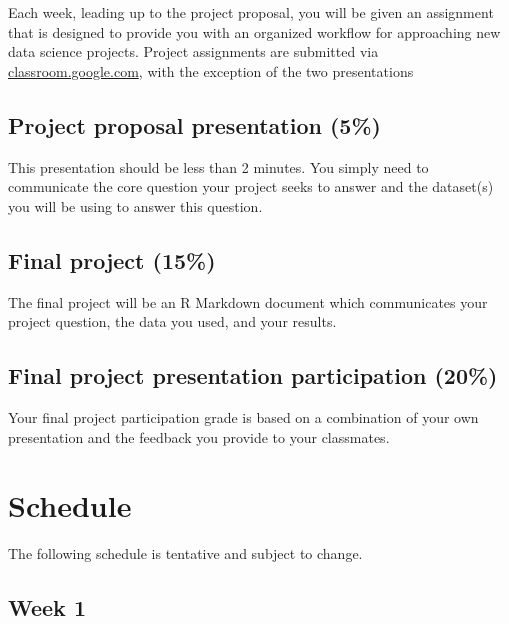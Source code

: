 \documentclass[]{book}
\theoremstyle{definition}
\theoremstyle{definition}
\theoremstyle{remark}
\begin{document}
Each week, leading up to the project proposal, you will be given an
assignment that is designed to provide you with an organized workflow
for approaching new data science projects. Project assignments are
submitted via \href{https//classroom.google.com}{classroom.google.com},
with the exception of the two presentations

\subsection*{Project proposal presentation
(5\%)}\label{project-proposal-presentation-5}

This presentation should be less than 2 minutes. You simply need to
communicate the core question your project seeks to answer and the
dataset(s) you will be using to answer this question.

\subsection*{Final project (15\%)}\label{final-project-15}

The final project will be an R Markdown document which communicates your
project question, the data you used, and your results.

\subsection*{Final project presentation participation
(20\%)}\label{final-project-presentation-participation-20}

Your final project participation grade is based on a combination of your
own presentation and the feedback you provide to your classmates.

\section*{Schedule}\label{schedule}

The following schedule is tentative and subject to change.

\subsection*{Week 1}\label{week-1}
\end{document}
